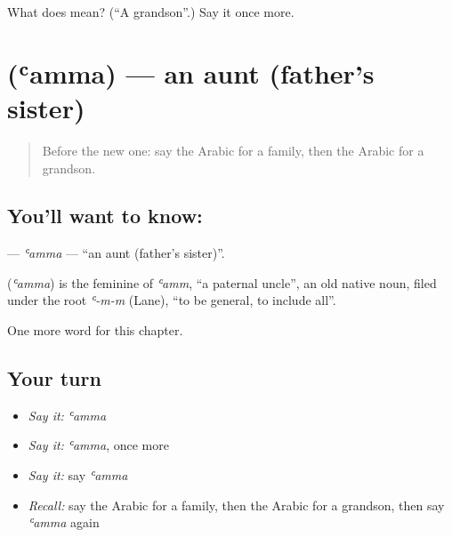 \begin{tcolorbox}[breakable,colback=teal!4,colframe=teal!35!black,title={Before you move on}]
What does  mean? (\textquotedblleft{}A grandson\textquotedblright{}.) Say it once more.
\end{tcolorbox}
\section[\texorpdfstring{\ar{عمة} (ʿamma)}{عمة (ʿamma)}]{ (ʿamma) — an aunt (father's sister)}

\label{lesson:AR-C246-amma}



\begin{quote}
Before the new one: say the Arabic for a family, then the Arabic for a grandson.
\end{quote}

\subsection*{You'll want to know: }
\textbf{} — \emph{ʿamma} — \textquotedblleft{}an aunt (father's sister)\textquotedblright{}.

\begin{cousinweb}
\textbf{} (\emph{ʿamma}) is the feminine of \emph{ʿamm}, \textquotedblleft{}a paternal uncle\textquotedblright{}, an old native noun, filed under the root \emph{ʿ-m-m} (Lane), \textquotedblleft{}to be general, to include all\textquotedblright{}.
\end{cousinweb}

\begin{grammarlens}[title={What you've built}]
One more word for this chapter.
\end{grammarlens}

\subsection*{Your turn}
\begin{itemize}
\raggedright
  \item \emph{Say it:} \emph{ʿamma}
  \item \emph{Say it:} \emph{ʿamma}, once more
  \item \emph{Say it:} say \emph{ʿamma}
  \item \emph{Recall:} say the Arabic for a family, then the Arabic for a grandson, then say \emph{ʿamma} again
\end{itemize}

